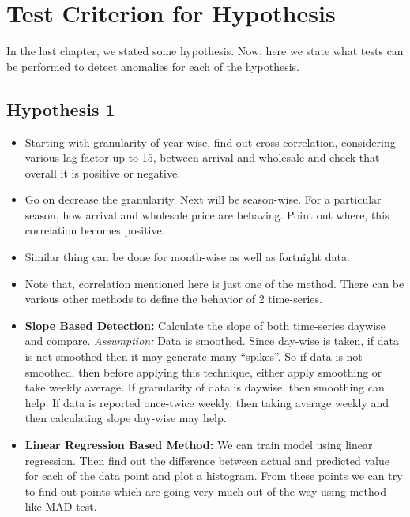 \section{Test Criterion for Hypothesis}

In the last chapter, we stated some hypothesis. Now, here we state what tests can be performed to detect anomalies for each of the hypothesis.

\subsection{Hypothesis 1}

\begin{itemize}

\item Starting with granularity of year-wise, find out cross-correlation, considering various lag factor up to 15,  between arrival and wholesale and check that overall it is positive or negative.

\item Go on decrease the granularity. Next will be season-wise. For a particular season, how arrival and wholesale price are behaving. Point out where, this correlation becomes positive.

\item Similar thing can be done for month-wise as well as fortnight data.

\item Note that, correlation mentioned here is just one of the method. There can be various other methods to define the behavior of 2 time-series.

\item \textbf{Slope Based Detection:} Calculate the slope of both time-series daywise and compare. \textit{Assumption:} Data is smoothed. Since day-wise is taken, if data is not smoothed then it may generate many “spikes”. So if data is not smoothed, then before applying this technique, either apply smoothing or take weekly average. If granularity of data is daywise, then smoothing can help. If data is reported once-twice weekly, then taking average weekly and then calculating slope day-wise may help.

\item \textbf{Linear Regression Based Method:} We can train model using linear regression. Then find out the difference between actual and predicted value for each of the data point and plot a histogram. From these points we can try to find out points which are going very much out of the way using method like MAD test.

\end{itemize}


